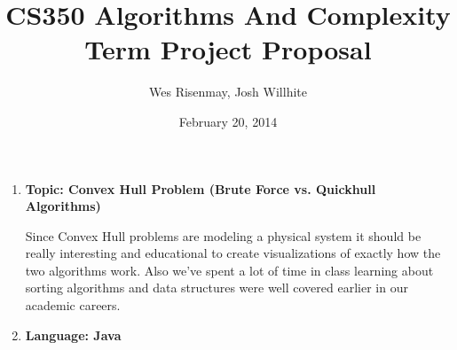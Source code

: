 \documentclass[a4paper , 12pt]{article}
\title{CS350 Algorithms And Complexity Term Project Proposal}
\date{February 20, 2014}
\author{Wes Risenmay, Josh Willhite}
\begin{document}
\maketitle
{

\begin{enumerate}
\item
  \textbf{Topic: Convex Hull Problem (Brute Force vs. Quickhull Algorithms)}

Since Convex Hull problems are modeling a physical system it should be really interesting and educational to create visualizations of exactly how the two algorithms work. Also we've spent a lot of time in class learning about sorting algorithms and data structures were well covered earlier in our academic careers. 
   
\item
  \textbf{Language: Java}


\end{enumerate}}
\end{document}
